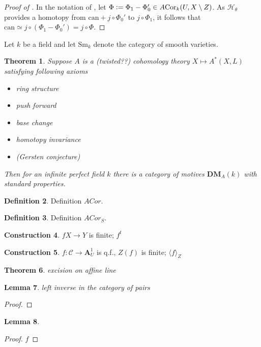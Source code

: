 \documentclass[a4paper, oneside, english,reqno]{amsart}
\theoremstyle{plain}
\newtheorem{theorem}{Theorem}[section]
\newtheorem{lemma}[theorem]{Lemma}
\theoremstyle{definition}
\newtheorem{definition}[theorem]{Definition}
\newtheorem{construction}[theorem]{Construction}
\theoremstyle{remark}
\newcommand{\defeq}{\vcentcolon=}
\newcommand{\ACor}{A\mkern-3mu\Cor}
\newcommand{\A}{\mathbf{A}}
\newcommand{\scrH}{\mathscr{H}}
\newcommand{\Sm}{\mathrm{Sm}}
\newcommand{\can}{\mathrm{can}}
\newcommand{\DMA}{{\mathbf{DM}}_A}
\DeclareMathOperator{\Cor}{Cor}
\begin{document}
\begin{proof}[Proof of ]
In the notation of , let $\Phi\defeq\Phi_1-\Phi_0'\in\ACor_k(U,X\setminus Z)$. As $\scrH_\theta$ provides a homotopy from $\can+j\circ\Phi_0'$ to $j\circ\Phi_1$, it follows that $\can\simeq j\circ(\Phi_1-\Phi_0')=j\circ\Phi$.
\end{proof}


\vspace{70pt}


Let $k$ be a field and let $\Sm_k$ denote the category of smooth varieties.

\begin{theorem}
Suppose $A$ is a (twisted??) cohomology theory $X\mapsto A^*(X,L)$ satisfying following axioms
\begin{itemize}
\item ring structure
\item push forward
\item base change
\item homotopy invariance
\item (Gersten conjecture)
\end{itemize}
Then for an infinite perfect field $k$ there is a category of motives $\DMA(k)$ with standard properties.
\end{theorem}

\begin{definition}
Definition $ACor$.
\end{definition}

\begin{definition}
Definition $ACor_S$.
\end{definition}


\begin{construction}\label{con:transposeCor}
$f X\to Y$ is finite; $f^t$
\end{construction}

\begin{construction}\label{con:CorRelCurve}
$f\colon \mathcal C\to \A^1_U$ is q.f., $Z(f)$ is finite;
$\langle f\rangle_Z$
\end{construction}


\begin{theorem}
excision on affine line
\end{theorem}
\begin{lemma}
left inverse in the category of pairs
\end{lemma}
\begin{proof}

\end{proof}
\begin{lemma}

\end{lemma}
\begin{proof}
$f$
\end{proof}






\printbibliography
\end{document}
